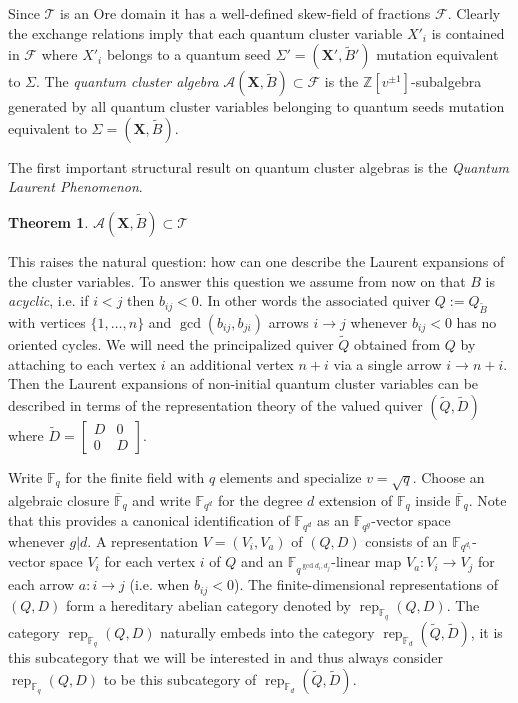 \documentclass{amsart}
\newtheorem{theorem}{Theorem}
\newcommand{\bfX}{\mathbf{X}}
\newcommand{\cA}{\mathcal{A}}
\newcommand{\cF}{\mathcal{F}}
\newcommand{\cT}{\mathcal{T}}
\newcommand{\FF}{\mathbb{F}}
\newcommand{\rep}{\operatorname{rep}}
\newcommand{\ZZ}{\mathbb{Z}}
\begin{document}
 Since $\cT$ is an Ore domain it has a well-defined skew-field of fractions $\cF$.  Clearly the exchange relations imply that each quantum cluster variable $X'_i$ is contained in $\cF$ where $X'_i$ belongs to a quantum seed $\Sigma'=(\bfX',\tilde B')$ mutation equivalent to $\Sigma$.  The \emph{quantum cluster algebra} $\cA(\bfX,\tilde B)\subset\cF$ is the $\ZZ[v^{\pm1}]$-subalgebra generated by all quantum cluster variables belonging to quantum seeds mutation equivalent to $\Sigma=(\bfX,\tilde B)$.

 The first important structural result on quantum cluster algebras is the \emph{Quantum Laurent Phenomenon}.
 \begin{theorem}\cite{berenstein-zelevinsky}
  $\cA(\bfX,\tilde B)\subset\cT$
 \end{theorem}
 This raises the natural question: how can one describe the Laurent expansions of the cluster variables.  To answer this question we assume from now on that $B$ is \emph{acyclic}, i.e. if $i<j$ then $b_{ij}<0$.  In other words the associated quiver $Q:=Q_{\tilde B}$ with vertices $\{1,\ldots,n\}$ and $\gcd(b_{ij},b_{ji})$ arrows $i\longrightarrow j$ whenever $b_{ij}<0$ has no oriented cycles.  We will need the principalized quiver $\tilde Q$ obtained from $Q$ by attaching to each vertex $i$ an additional vertex $n+i$ via a single arrow $i\to n+i$.  Then the Laurent expansions of non-initial quantum cluster variables can be described in terms of the representation theory of the valued quiver $(\tilde Q,\tilde D)$ where $\tilde D=\left[\begin{array}{cc}D&0\\0&D\end{array}\right]$.

 Write $\FF_q$ for the finite field with $q$ elements and specialize $v=\sqrt{q}$.  Choose an algebraic closure $\overline{\FF}_q$ and write $\FF_{q^d}$ for the degree $d$ extension of $\FF_q$ inside $\overline{\FF}_q$.  Note that this provides a canonical identification of $\FF_{q^d}$ as an $\FF_{q^g}$-vector space whenever $g|d$.  A representation $V=(V_i,V_a)$ of $(Q,D)$ consists of an $\FF_{q^{d_i}}$-vector space $V_i$ for each vertex $i$ of $Q$ and an $\FF_{q^{\gcd{d_i,d_j}}}$-linear map $V_a:V_i\to V_j$ for each arrow $a:i\to j$ (i.e. when $b_{ij}<0$).  The finite-dimensional representations of $(Q,D)$ form a hereditary abelian category denoted by $\rep_{\FF_q}\!(Q,D)$.  The category $\rep_{\FF_q}\!(Q,D)$ naturally embeds into the category $\rep_{\FF_d}\!(\tilde Q,\tilde D)$, it is this subcategory that we will be interested in and thus always consider $\rep_{\FF_q}\!(Q,D)$ to be this subcategory of $\rep_{\FF_d}\!(\tilde Q,\tilde D)$.  
\end{document}
